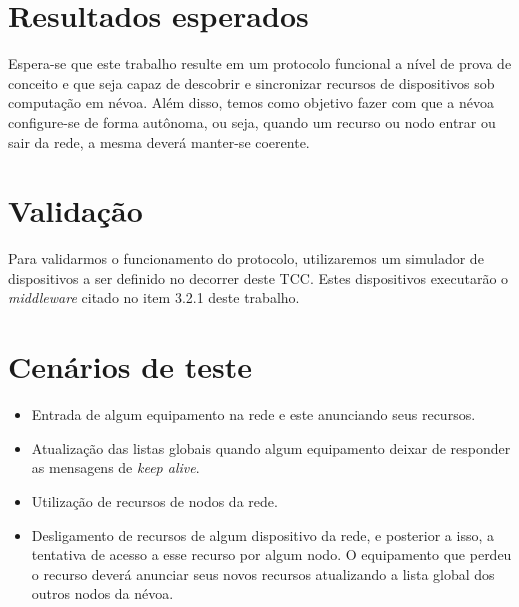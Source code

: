 



\section{Resultados esperados}

Espera-se que este trabalho resulte em um protocolo funcional a nível de prova de conceito e que seja capaz de descobrir e sincronizar recursos de dispositivos sob computação em névoa.
Além disso, temos como objetivo fazer com que a névoa configure-se de forma autônoma, ou seja, quando um recurso ou nodo entrar ou sair da rede, a mesma deverá manter-se coerente.

\section{Validação}




Para validarmos o funcionamento do protocolo, utilizaremos um simulador de dispositivos a ser definido no decorrer deste TCC.
Estes dispositivos executarão o \textit{middleware} citado no item 3.2.1 deste trabalho.

\section{Cenários de teste}

\begin{itemize}
    \item Entrada de algum equipamento na rede e este anunciando seus recursos. 
    \item Atualização das listas globais quando algum equipamento deixar de responder as mensagens de \textit{keep alive}.
    \item Utilização de recursos de nodos da rede.
    \item Desligamento de recursos de algum dispositivo da rede, e posterior a isso, a tentativa de acesso a esse recurso por algum nodo.
    O equipamento que perdeu o recurso deverá anunciar seus novos recursos atualizando a lista global dos outros nodos da névoa.
\end{itemize}













